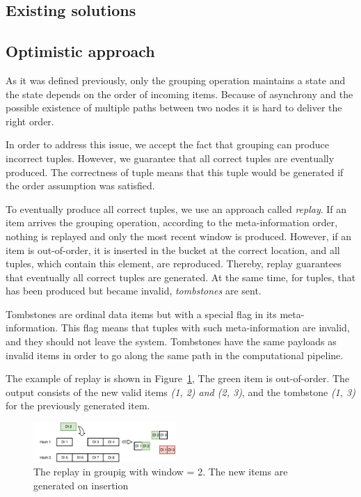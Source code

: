 \label {fs-collision}

\subsection{Existing solutions}

\subsection{Optimistic approach}

As it was defined previously, only the grouping operation maintains a state and the state depends on the order of incoming items. Because of asynchrony and the possible existence of multiple paths between two nodes it is hard to deliver the right order.

In order to address this issue, we accept the fact that grouping can produce incorrect tuples. However, we guarantee that all correct tuples are eventually produced. The correctness of tuple means that this tuple would be generated if the order assumption was satisfied. 

To eventually produce all correct tuples, we use an approach called {\it replay}. If an item arrives the grouping operation, according to the meta-information order, nothing is replayed and only the most recent window is produced. However, if an item is out-of-order, it is inserted in the bucket at the correct location, and all tuples, which contain this element, are reproduced. Thereby, replay guarantees that eventually all correct tuples are generated. At the same time, for tuples, that has been produced but became invalid, {\it tombstones} are sent.

Tombstones are ordinal data items but with a special flag in its meta-information. This flag means that tuples with such meta-information are invalid, and they should not leave the system. Tombstones have the same payloads as invalid items in order to go along the same path in the computational pipeline.

The example of replay is shown in Figure~\ref{grouping-replaying}, The green item is out-of-order. The output consists of the new valid items {\it (1, 2) and (2, 3)}, and the tombstone {\it (1, 3)} for the previously generated item.

\begin{figure}[htbp]
  \centering
  \includegraphics[width=0.48\textwidth]{pics/grouping-replaying}
  \caption{The replay in groupig with window = 2. The new items are generated on insertion}
  \label {grouping-replaying}
\end{figure}

